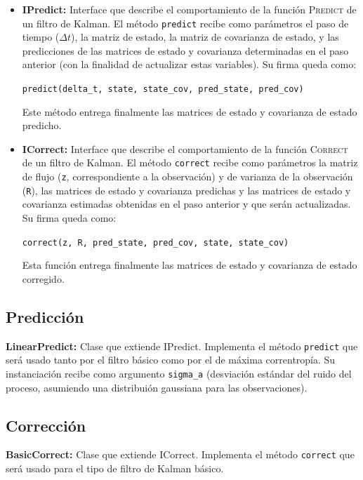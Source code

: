 \begin{itemize}
\item \textbf{IPredict:} Interface que describe el comportamiento de la funci\'on \textsc{Predict} de un filtro de Kalman. El m\'etodo \texttt{predict} recibe como par\'ametros el paso de tiempo ($\Delta t$), la matriz de estado, la matriz de covarianza de estado, y las predicciones de las matrices de estado y covarianza determinadas en el paso anterior (con la finalidad de actualizar estas variables). Su firma queda como:
\begin{center}
\texttt{predict(delta\_t, state, state\_cov, pred\_state, pred\_cov)}
\end{center}
Este m\'etodo entrega finalmente las matrices de estado y covarianza de estado predicho.
\bigskip

\item \textbf{ICorrect:} Interface que describe el comportamiento de la funci\'on \textsc{Correct} de un filtro de Kalman. El m\'etodo \texttt{correct} recibe como par\'ametros la matriz de flujo (\texttt{z}, correspondiente a la observaci\'on) y de varianza de la observaci\'on (\texttt{R}), las matrices de estado y covarianza predichas y las matrices de estado y covarianza estimadas obtenidas en el paso anterior y que ser\'an actualizadas. Su firma queda como:
\begin{center}
\texttt{correct(z, R, pred\_state, pred\_cov, state, state\_cov)}
\end{center}
\bigskip
Esta funci\'on entrega finalmente las matrices de estado y covarianza de estado corregido.

\end{itemize}

\subsection{Predicci\'on}
\textbf{LinearPredict:} Clase que extiende IPredict. Implementa el m\'etodo \texttt{predict} que ser\'a usado tanto por el filtro b\'asico como por el de m\'axima correntrop\'ia. Su instanciaci\'on recibe como argumento \texttt{sigma\_a} (desviaci\'on est\'andar del ruido del proceso, asumiendo una distribui\'on gaussiana para las observaciones).
\bigskip


\subsection{Correcci\'on}
\textbf{BasicCorrect:} Clase que extiende ICorrect. Implementa el m\'etodo \texttt{correct} que ser\'a usado para el tipo de filtro de Kalman b\'asico.
\bigskip

